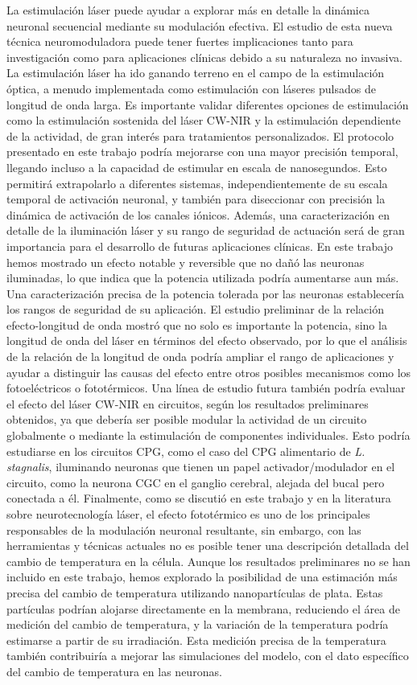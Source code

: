 La estimulación láser puede ayudar a explorar más en detalle la dinámica neuronal secuencial mediante su modulación efectiva. El estudio de esta nueva técnica neuromoduladora puede tener fuertes implicaciones tanto para investigación como para aplicaciones clínicas debido a su naturaleza no invasiva. La estimulación láser ha ido ganando terreno en el campo de la estimulación óptica, a menudo implementada como estimulación con láseres pulsados de longitud de onda larga. Es importante validar diferentes opciones de estimulación como la estimulación sostenida del láser CW-NIR y la estimulación dependiente de la actividad, de gran interés para tratamientos personalizados. El protocolo presentado en este trabajo podría mejorarse con una mayor precisión temporal, llegando incluso a la capacidad de estimular en escala de nanosegundos. Esto permitirá extrapolarlo a diferentes sistemas, independientemente de su escala temporal de activación neuronal, y también para diseccionar con precisión la dinámica de activación de los canales iónicos. Además, una caracterización en detalle de la iluminación láser y su rango de seguridad de actuación será de gran importancia para el desarrollo de futuras aplicaciones clínicas. En este trabajo hemos mostrado un efecto notable y reversible que no dañó las neuronas iluminadas, lo que indica que la potencia utilizada podría aumentarse aun más. Una caracterización precisa de la potencia tolerada por las neuronas establecería los rangos de seguridad de su aplicación. El estudio preliminar de la relación efecto-longitud de onda mostró que no solo es importante la potencia, sino la longitud de onda del láser en términos del efecto observado, por lo que el análisis de la relación de la longitud de onda podría ampliar el rango de aplicaciones y ayudar a distinguir las causas del efecto entre otros posibles mecanismos como los fotoeléctricos o fototérmicos. Una línea de estudio futura también podría evaluar el efecto del láser CW-NIR en circuitos, según los resultados preliminares obtenidos, ya que debería ser posible modular la actividad de un circuito globalmente o mediante la estimulación de componentes individuales. Esto podría estudiarse en los circuitos  CPG, como el caso del CPG alimentario de \textit{L. stagnalis}, iluminando neuronas que tienen un papel activador/modulador en el circuito, como la neurona CGC en el ganglio cerebral, alejada del bucal pero conectada a él. Finalmente, como se discutió en este trabajo y en la literatura sobre neurotecnología láser, el efecto fototérmico es uno de los principales responsables de la modulación neuronal resultante, sin embargo, con las herramientas y técnicas actuales no es posible tener una descripción detallada del cambio de temperatura en la célula. Aunque los resultados preliminares no se han incluido en este trabajo, hemos explorado la posibilidad de una estimación más precisa del cambio de temperatura utilizando nanopartículas de plata. Estas partículas podrían alojarse directamente en la membrana, reduciendo el área de medición del cambio de temperatura, y la variación de la temperatura podría estimarse a partir de su irradiación. Esta medición precisa de la temperatura también contribuiría a mejorar las simulaciones del modelo, con el dato específico del cambio de temperatura en las neuronas. 